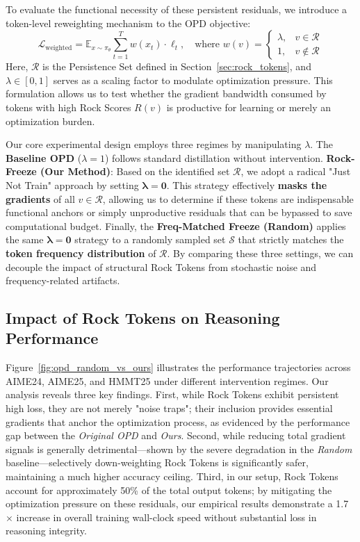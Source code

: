 To evaluate the functional necessity of these persistent residuals, we introduce a token-level reweighting mechanism to the OPD objective:
\begin{equation}
\mathcal{L}_{\text{weighted}} = \mathbb{E}_{x \sim \pi_\theta} \sum_{t=1}^{T} w(x_t) \cdot \ell_t, \quad \text{where } 
w(v) = \begin{cases} \lambda, & v \in \mathcal{R} \\ 1, & v \notin \mathcal{R} \end{cases}
\end{equation}
Here, $\mathcal{R}$ is the Persistence Set defined in Section~\ref{sec:rock_tokens}, and $\lambda \in [0, 1]$ serves as a scaling factor to modulate optimization pressure. This formulation allows us to test whether the gradient bandwidth consumed by tokens with high Rock Scores $R(v)$ is productive for learning or merely an optimization burden.

Our core experimental design employs three regimes by manipulating $\lambda$. The \textbf{Baseline OPD} ($\lambda=1$) follows standard distillation without intervention. \textbf{Rock-Freeze (Our Method)}: Based on the identified set $\mathcal{R}$, we adopt a radical "Just Not Train" approach by setting $\mathbf{\lambda = 0}$. This strategy effectively \textbf{masks the gradients} of all $v \in \mathcal{R}$, allowing us to determine if these tokens are indispensable functional anchors or simply unproductive residuals that can be bypassed to save computational budget. Finally, the \textbf{Freq-Matched Freeze (Random)} applies the same $\mathbf{\lambda=0}$ strategy to a randomly sampled set $\mathcal{S}$ that strictly matches the \textbf{token frequency distribution} of $\mathcal{R}$. By comparing these three settings, we can decouple the impact of structural Rock Tokens from stochastic noise and frequency-related artifacts.




\subsection{Impact of Rock Tokens on Reasoning Performance}

Figure~\ref{fig:opd_random_vs_ours} illustrates the performance trajectories across AIME24, AIME25, and HMMT25 under different intervention regimes. Our analysis reveals three key findings. First, while Rock Tokens exhibit persistent high loss, they are not merely "noise traps"; their inclusion provides essential gradients that anchor the optimization process, as evidenced by the performance gap between the \textit{Original OPD} and \textit{Ours}. Second, while reducing total gradient signals is generally detrimental—shown by the severe degradation in the \textit{Random} baseline—selectively down-weighting Rock Tokens is significantly safer, maintaining a much higher accuracy ceiling. Third, in our setup, Rock Tokens account for approximately 50\% of the total output tokens; by mitigating the optimization pressure on these residuals, our empirical results demonstrate a 1.7$\times$ increase in overall training wall-clock speed without substantial loss in reasoning integrity.


